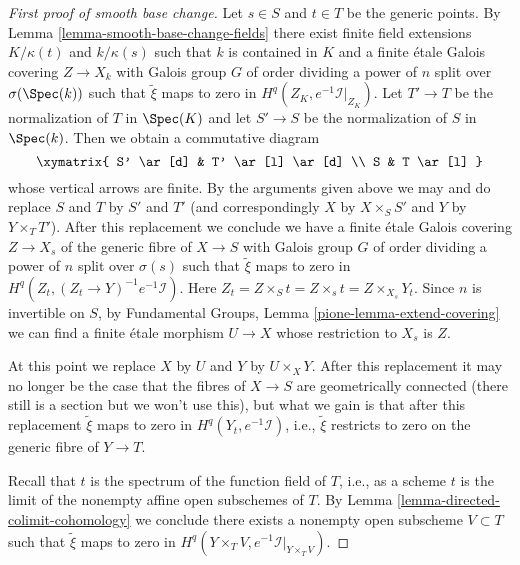 \begin{proof}[First proof of smooth base change]
\medskip\noindent
Let $s \in S$ and $t \in T$ be the generic points. By
Lemma \ref{lemma-smooth-base-change-fields} there exist finite field
extensions $K/\kappa(t)$ and $k/\kappa(s)$ such that $k$ is contained in $K$
and a finite \'etale Galois covering $Z \to X_k$ with Galois group $G$
of order dividing a power of $n$ split over $\sigma(\Spec(k))$
such that $\tilde \xi$ maps to zero in $H^q(Z_K, e^{-1}\mathcal{I}|_{Z_K})$.
Let $T' \to T$ be the normalization of $T$ in $\Spec(K)$
and let $S' \to S$ be the normalization of $S$ in $\Spec(k)$.
Then we obtain a commutative diagram
$$
\xymatrix{
S' \ar[d] & T' \ar[l] \ar[d] \\
S & T \ar[l]
}
$$
whose vertical arrows are finite. By the arguments given above we
may and do replace $S$ and $T$ by $S'$ and $T'$ (and correspondingly
$X$ by $X \times_S S'$ and $Y$ by $Y \times_T T'$). After this replacement
we conclude we have a finite \'etale Galois covering
$Z \to X_s$ of the generic fibre of $X \to S$
with Galois group $G$ of order dividing a power of $n$
split over $\sigma(s)$ such that $\tilde \xi$ maps to zero in
$H^q(Z_t, (Z_t \to Y)^{-1}e^{-1}\mathcal{I})$.
Here $Z_t = Z \times_S t = Z \times_s t = Z \times_{X_s} Y_t$.
Since $n$ is invertible on $S$,
by Fundamental Groups, Lemma \ref{pione-lemma-extend-covering}
we can find a finite \'etale morphism $U \to X$ whose restriction to $X_s$
is $Z$.

\medskip\noindent
At this point we replace $X$ by $U$ and $Y$ by $U \times_X Y$.
After this replacement it may
no longer be the case that the fibres of $X \to S$ are geometrically
connected (there still is a section but we won't use this), but what
we gain is that after this replacement $\tilde \xi$ maps to zero
in $H^q(Y_t, e^{-1}\mathcal{I})$, i.e., $\tilde \xi$ restricts to
zero on the generic fibre of $Y \to T$.

\medskip\noindent
Recall that $t$ is the spectrum of the function field of $T$, i.e.,
as a scheme $t$ is the limit of the nonempty affine open subschemes of $T$.
By Lemma \ref{lemma-directed-colimit-cohomology} we conclude there exists
a nonempty open subscheme $V \subset T$ such that $\tilde \xi$ maps to zero in
$H^q(Y \times_T V, e^{-1}\mathcal{I}|_{Y \times_T V})$.


\end{proof}
